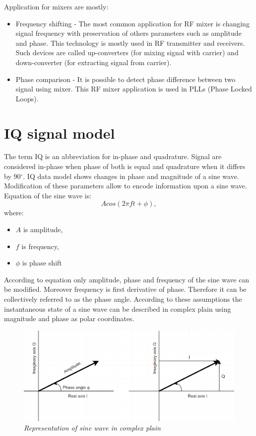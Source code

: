 \documentclass[en,printmode]{mgr}
\begin{document}
		Application for mixers are mostly:
		\begin{itemize}
			\item Frequency shifting - The most common application for RF mixer is changing signal frequency
			with preservation of others parameters such as amplitude and phase.
			This technology is mostly used in RF transmitter and receivers.
			Such devices are called up-converters (for mixing signal with carrier) and down-converter (for
			extracting signal from carrier).
			\item Phase comparison - It is possible to detect phase difference between two signal using mixer.
			This RF mixer application is used in PLLs (Phase Locked Loops).
		\end{itemize}
	
	\section{IQ signal model}
			The term IQ is an abbreviation for in-phase and quadrature. Signal are considered in-phase when phase
		of both is equal and quadrature when it differs by 90$^{\circ}$. IQ data model shows changes in phase and
		magnitude of a sine wave. Modification of these parameters allow to encode information upon a sine wave.
		\\
		
		\noindent				
		Equation of the sine wave is:
		\[
			A cos\left(2\pi f t+ \phi\right), \label{eq:sinewave}
		\]
		where:
		\begin{itemize}
			\item $A$ is amplitude,
			\item $f$ is frequency,
			\item $\phi$ is phase shift
		\end{itemize}
		
		According to equation \label{eq:sinewave} only amplitude, phase and frequency of the sine wave can be
		modified. Moreover frequency is first derivative of phase. Therefore it can be collectively referred to 
		as the phase angle. According to these assumptions the instantaneous state of a sine wave can be described
		in complex plain using magnitude and phase as polar coordinates.
		
		\begin{figure}[!htb]
    		\centering
   			\includegraphics[width=\textwidth]{plots/polarplots.png}
    		\caption{\textit{Representation of sine wave in complex plain}}
    		\label{fig:polarplot}
		\end{figure}
		
\end{document}
